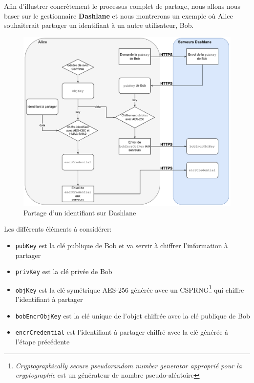 Afin d'illustrer concrètement le processus complet de partage, nous allons nous baser sur le gestionnaire \textbf{Dashlane} et nous montrerons un exemple où Alice souhaiterait partager un identifiant à un autre utilisateur, Bob.
\newpage 
\begin{figure}[h!]
	\includegraphics[width=15.5cm]{images/dashlane_share_alice.png}
	\centering
	\caption{Partage d'un identifiant sur Dashlane}
\end{figure}

Les différents éléments à considérer:
\begin{itemize}
	\item \verb|pubKey| est la clé publique de Bob et va servir à chiffrer l'information à partager
	\item \verb|privKey| est la clé privée de Bob
	\item \verb|objKey| est la clé symétrique AES-256 générée avec un CSPRNG\footnote{\textit{Cryptographically secure pseudorandom number generator approprié pour la cryptographie} est un générateur de nombre pseudo-aléatoire} qui chiffre l'identifiant à partager
	\item \verb|bobEncrObjKey| est la clé unique de l'objet chiffrée avec la clé publique de Bob
	\item \verb|encrCredential| est l'identifiant à partager chiffré avec la clé générée à l'étape précédente
\end{itemize}

